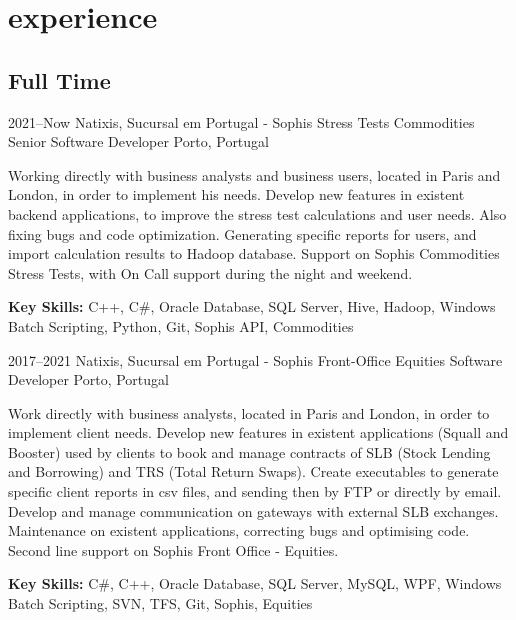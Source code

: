 \documentclass[]{friggeri-cv} %
\begin{document}

\section{experience}

\subsection{Full Time}

\begin{entrylist}


\entry
    {2021--Now}
    {Natixis, Sucursal em Portugal - Sophis Stress Tests Commodities}
    {Senior Software Developer}
    {Porto, Portugal}
    {
        Working directly with business analysts and business users, located in Paris and London, in order to implement his needs. Develop new features in existent backend applications, to improve the stress test calculations and user needs. Also fixing bugs and code optimization. Generating specific reports for users, and import calculation results to Hadoop database. Support on Sophis Commodities Stress Tests, with On Call support during the night and weekend.

        \textbf{Key Skills:}
        C++, C\#, Oracle Database, SQL Server, Hive, Hadoop, Windows Batch Scripting, Python, Git, Sophis API, Commodities
    }




\entry
    {2017--2021}
    {Natixis, Sucursal em Portugal - Sophis Front-Office Equities}
    {Software Developer}
    {Porto, Portugal}
    {
        Work directly with business analysts, located in Paris and London, in order to implement client needs. Develop new features in existent applications (Squall and Booster) used by clients to book and manage contracts of SLB (Stock Lending and Borrowing) and TRS (Total Return Swaps).  Create executables to generate specific client reports in csv files, and sending then by FTP or directly by email. Develop and manage communication on gateways with external SLB exchanges. Maintenance on existent applications, correcting bugs and optimising code. Second line support on Sophis Front Office - Equities.

        \textbf{Key Skills:}
        C\#, C++, Oracle Database, SQL Server, MySQL, WPF, Windows Batch Scripting, SVN, TFS, Git, Sophis, Equities
    }


\end{entrylist}
\end{document}
